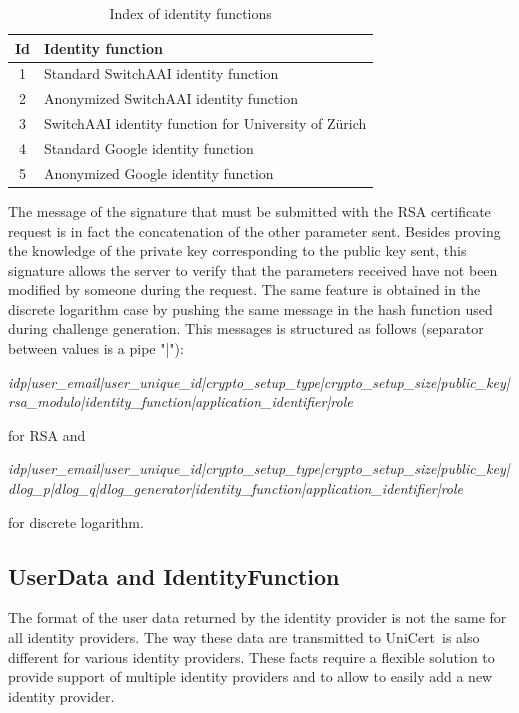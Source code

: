 \documentclass[oneside]{scrreprt}
\newcommand{\unicert}{\mbox{UniCert}}
\begin{document}
\begin{table}[ht]
\centering
\begin{tabular}{|c|l|}
  \hline
  Id & Identity function\\
  \hline
  1 & Standard SwitchAAI identity function\\
  2 & Anonymized SwitchAAI identity function\\
  3 & SwitchAAI identity function for University of Zürich\\
  4 & Standard Google identity function\\
  5 & Anonymized Google identity function\\
  \hline
\end{tabular}
\caption{Index of identity functions}
\label{t:idfunc}
\end{table}

The message of the signature that must be submitted with the RSA certificate request is in fact the concatenation of the other parameter sent. Besides proving the knowledge of the private key corresponding to the public key sent, this signature allows the server to verify that the parameters received have not been modified by someone during the request. The same feature is obtained in the discrete logarithm case by pushing the same message in the hash function used during challenge generation. This messages is structured as follows (separator between values is a pipe "|"):

\textit{idp|user\_email|user\_unique\_id|crypto\_setup\_type|crypto\_setup\_size|public\_key|\\rsa\_modulo|identity\_function|application\_identifier|role}

for RSA and

\textit{idp|user\_email|user\_unique\_id|crypto\_setup\_type|crypto\_setup\_size|public\_key|\\dlog\_p|dlog\_q|dlog\_generator|identity\_function|application\_identifier|role}

for discrete logarithm.




\subsection{UserData and IdentityFunction}

The format of the user data returned by the identity provider is not the same for all identity providers. The way these data are transmitted to \unicert\ is also different for various identity providers. These facts require a flexible solution to provide support of multiple identity providers and to allow to easily add a new identity provider.
\end{document}
